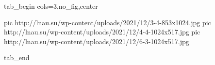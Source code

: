  
 
 
 
 

\ifcmt
  tab_begin cols=3,no_fig,center

     pic http://lnau.su/wp-content/uploads/2021/12/3-4-853x1024.jpg
		 pic http://lnau.su/wp-content/uploads/2021/12/4-4-1024x517.jpg
		 pic http://lnau.su/wp-content/uploads/2021/12/6-3-1024x517.jpg

  tab_end
\fi

\begin{center}
\end{center}
